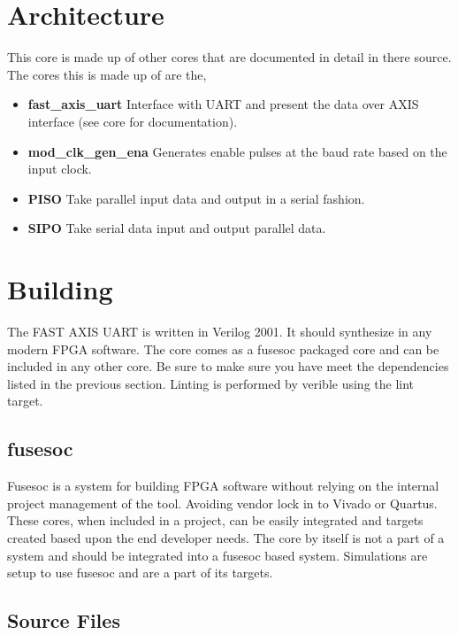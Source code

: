 \section{Architecture}
\par
This core is made up of other cores that are documented in detail in there source. The cores this is made up of are the,
\begin{itemize}
  \item \textbf{fast\_axis\_uart} Interface with UART and present the data over AXIS interface (see core for documentation).
  \item \textbf{mod\_clk\_gen\_ena} Generates enable pulses at the baud rate based on the input clock.
  \item \textbf{PISO} Take parallel input data and output in a serial fashion.
  \item \textbf{SIPO} Take serial data input and output parallel data.
\end{itemize}

\section{Building}

\par
The FAST AXIS UART is written in Verilog 2001. It should synthesize in any modern FPGA software. The core comes as a fusesoc packaged core and can be included in any other core. Be sure to make sure you have meet the dependencies listed in the previous section. Linting is performed by verible using the lint target.

\subsection{fusesoc}
\par
Fusesoc is a system for building FPGA software without relying on the internal project management of the tool. Avoiding vendor lock in to Vivado or Quartus.
These cores, when included in a project, can be easily integrated and targets created based upon the end developer needs. The core by itself is not a part of
a system and should be integrated into a fusesoc based system. Simulations are setup to use fusesoc and are a part of its targets.

\subsection{Source Files}

